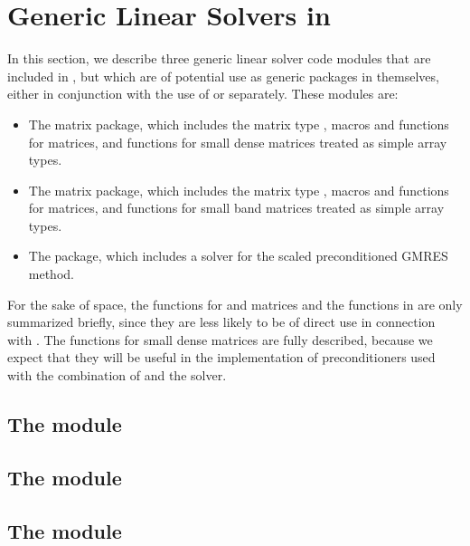 \chapter{Generic Linear Solvers in {\sundials}}\label{s:gen_linsolv}
In this section, we describe three generic linear solver code modules that 
are included in {\cvodes}, but which are of potential use as generic packages in
themselves, either in conjunction with the use of {\cvodes} or separately.
These modules are:
\begin{itemize}
\item The {\dense} matrix package, which includes the matrix type ,
      macros and functions for  matrices, and functions
      for small dense matrices treated as simple array types.
\item The {\band} matrix package, which includes the matrix type ,
      macros and functions for  matrices, and functions
      for small band matrices treated as simple array types.
\item The {\spgmr} package, which includes a solver for the scaled
      preconditioned GMRES method.
\end{itemize}

For the sake of space, the functions for  and
 matrices and the functions in {\spgmr} are only summarized
briefly, since they are less likely to be of direct use in connection
with {\cvodes}.  The functions for small dense matrices are fully
described, because we expect that they will be useful in the
implementation of preconditioners used with the combination of {\cvodes}
and the {\cvspgmr} solver.

\section{The {\dense} module}\label{ss:dense}


\section{The {\band} module}\label{ss:band}


\section{The {\spgmr} module}\label{ss:spgmr}


